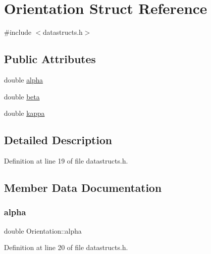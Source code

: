 \hypertarget{struct_orientation}{}\section{Orientation Struct Reference}
\label{struct_orientation}


{\ttfamily \#include $<$datastructs.\+h$>$}

\subsection*{Public Attributes}
\begin{DoxyCompactItemize}
\item 
double \mbox{\hyperlink{struct_orientation_a6c74f24ac48bd9fdbada2ae67860afe1}{alpha}}
\item 
double \mbox{\hyperlink{struct_orientation_acffab8b9c7a0f6b4a5e24d049f736abe}{beta}}
\item 
double \mbox{\hyperlink{struct_orientation_a483c403b991cf9ba87eddbbd2fb7875f}{kappa}}
\end{DoxyCompactItemize}


\subsection{Detailed Description}


Definition at line 19 of file datastructs.\+h.



\subsection{Member Data Documentation}
\mbox{\label{struct_orientation_a6c74f24ac48bd9fdbada2ae67860afe1}} 
\subsubsection{\texorpdfstring{alpha}{alpha}}
{\footnotesize\ttfamily double Orientation\+::alpha}



Definition at line 20 of file datastructs.\+h.

\mbox{\label{struct_orientation_acffab8b9c7a0f6b4a5e24d049f736abe}} 
